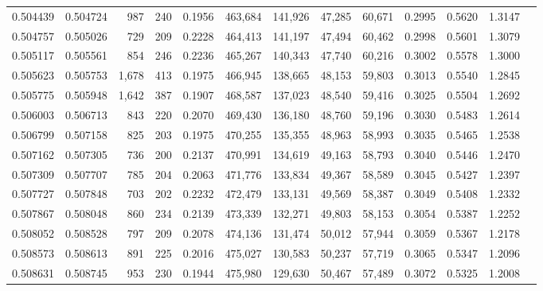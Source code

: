 \begin{tabular}{rrrrrrrrrrrrr}
0.504439 & 0.504724 &    987 &   240 &                                     0.1956 & 463,684 & 141,926 &  47,285 &  60,671 & 0.2995 & 0.5620 & 1.3147 \\
0.504757 & 0.505026 &    729 &   209 &                                     0.2228 & 464,413 & 141,197 &  47,494 &  60,462 & 0.2998 & 0.5601 & 1.3079 \\
0.505117 & 0.505561 &    854 &   246 &                                     0.2236 & 465,267 & 140,343 &  47,740 &  60,216 & 0.3002 & 0.5578 & 1.3000 \\
0.505623 & 0.505753 &  1,678 &   413 &                                     0.1975 & 466,945 & 138,665 &  48,153 &  59,803 & 0.3013 & 0.5540 & 1.2845 \\
0.505775 & 0.505948 &  1,642 &   387 &                                     0.1907 & 468,587 & 137,023 &  48,540 &  59,416 & 0.3025 & 0.5504 & 1.2692 \\
0.506003 & 0.506713 &    843 &   220 &                                     0.2070 & 469,430 & 136,180 &  48,760 &  59,196 & 0.3030 & 0.5483 & 1.2614 \\
0.506799 & 0.507158 &    825 &   203 &                                     0.1975 & 470,255 & 135,355 &  48,963 &  58,993 & 0.3035 & 0.5465 & 1.2538 \\
0.507162 & 0.507305 &    736 &   200 &                                     0.2137 & 470,991 & 134,619 &  49,163 &  58,793 & 0.3040 & 0.5446 & 1.2470 \\
0.507309 & 0.507707 &    785 &   204 &                                     0.2063 & 471,776 & 133,834 &  49,367 &  58,589 & 0.3045 & 0.5427 & 1.2397 \\
0.507727 & 0.507848 &    703 &   202 &                                     0.2232 & 472,479 & 133,131 &  49,569 &  58,387 & 0.3049 & 0.5408 & 1.2332 \\
0.507867 & 0.508048 &    860 &   234 &                                     0.2139 & 473,339 & 132,271 &  49,803 &  58,153 & 0.3054 & 0.5387 & 1.2252 \\
0.508052 & 0.508528 &    797 &   209 &                                     0.2078 & 474,136 & 131,474 &  50,012 &  57,944 & 0.3059 & 0.5367 & 1.2178 \\
0.508573 & 0.508613 &    891 &   225 &                                     0.2016 & 475,027 & 130,583 &  50,237 &  57,719 & 0.3065 & 0.5347 & 1.2096 \\
0.508631 & 0.508745 &    953 &   230 &                                     0.1944 & 475,980 & 129,630 &  50,467 &  57,489 & 0.3072 & 0.5325 & 1.2008 \\

\end{tabular}
